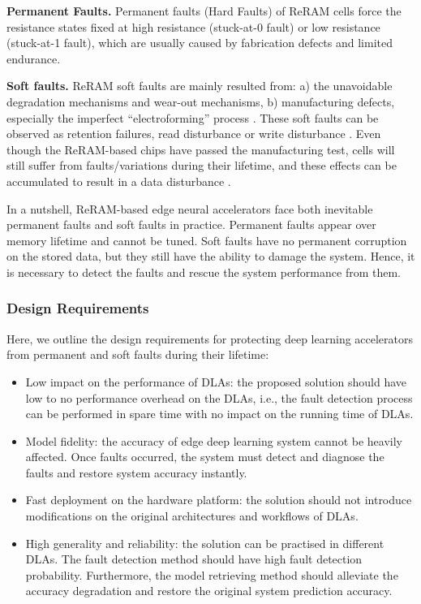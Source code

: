 {\bf Permanent Faults. } Permanent faults (Hard Faults) of ReRAM cells force the resistance states fixed at high resistance (stuck-at-0 fault) or low resistance (stuck-at-1 fault), which are usually caused by fabrication defects \cite{6725492} and limited endurance. 


{\bf Soft faults.} ReRAM soft faults are mainly resulted from: a) the unavoidable degradation mechanisms and wear-out mechanisms, b) manufacturing defects, especially the imperfect ``electroforming'' process \cite{6957074, Liu:2019:FTN:3287624.3288743}. These soft faults can be observed as retention failures, read disturbance or write disturbance \cite{7879109,8267883}. Even though the ReRAM-based chips have passed the manufacturing test, cells will still suffer from faults/variations during their lifetime, and these effects can be accumulated to result in a data disturbance \cite{8624687}. 

In a nutshell, ReRAM-based edge neural accelerators face both inevitable permanent faults and soft faults in practice.  Permanent faults appear over memory lifetime and cannot be tuned. Soft faults have no permanent corruption on the stored data, but they still have the ability to damage the system. Hence, it is necessary to detect the faults and rescue the system performance from them.  

\subsubsection{Design Requirements}
Here, we outline the design requirements for protecting deep learning accelerators from permanent and soft faults during their lifetime:
\begin{itemize}
    \item Low impact on the performance of DLAs: the proposed solution should have low to no performance overhead on the DLAs, i.e., the fault detection process can be performed in spare time with no impact on the running time of DLAs.

    \item Model fidelity: the accuracy of edge deep learning system cannot be heavily affected. Once faults occurred, the system must detect and diagnose the faults and restore system accuracy instantly.

    \item Fast deployment on the hardware platform: the solution should not introduce modifications on the original architectures and workflows of DLAs.

    \item High generality and reliability: the solution can be practised in different DLAs. The fault detection method should have high fault detection probability. Furthermore, the model retrieving method should alleviate the accuracy degradation and restore the original system prediction accuracy.

\end{itemize}

